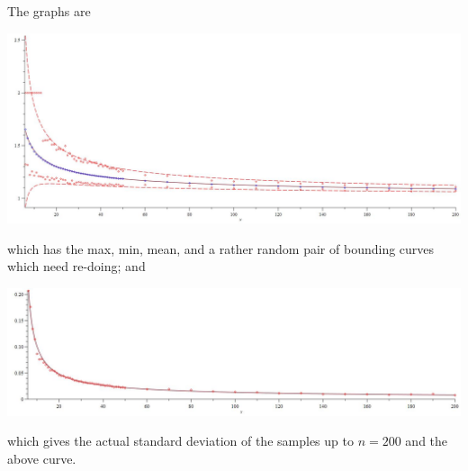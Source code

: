 \documentclass[12pt]{article}
\begin{document}
 The graphs are
 \begin{center}
\includegraphics[width=15cm]{max-min-trees1.jpg}
\end{center}
which has the max, min, mean, and a rather random pair of bounding curves which need re-doing; and
\begin{center}
\includegraphics[width=15cm]{sd-trees.jpg}
\end{center}
which gives the actual standard deviation of the samples up to $n=200$ and the above curve.
\end{document}

